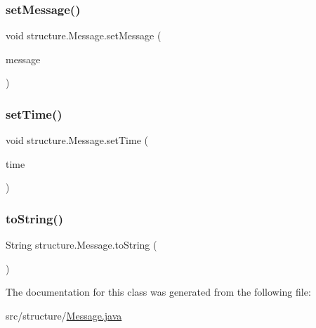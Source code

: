 \mbox{\label{classstructure_1_1_message_a1907224cce70e3247d280965bb74b412}} 
\subsubsection{\texorpdfstring{set\+Message()}{setMessage()}}
{\footnotesize\ttfamily void structure.\+Message.\+set\+Message (\begin{DoxyParamCaption}\item[{final String}]{message }\end{DoxyParamCaption})}

\mbox{\label{classstructure_1_1_message_a7e2febd60ee915acad6cdabea44af622}} 
\subsubsection{\texorpdfstring{set\+Time()}{setTime()}}
{\footnotesize\ttfamily void structure.\+Message.\+set\+Time (\begin{DoxyParamCaption}\item[{final Local\+Time}]{time }\end{DoxyParamCaption})}

\mbox{\label{classstructure_1_1_message_a7c4f04f22c5ff83311e33cd54e7f4ce3}} 
\subsubsection{\texorpdfstring{to\+String()}{toString()}}
{\footnotesize\ttfamily String structure.\+Message.\+to\+String (\begin{DoxyParamCaption}{ }\end{DoxyParamCaption})}



The documentation for this class was generated from the following file\+:\begin{DoxyCompactItemize}
\item 
src/structure/\hyperlink{_message_8java}{Message.\+java}\end{DoxyCompactItemize}
